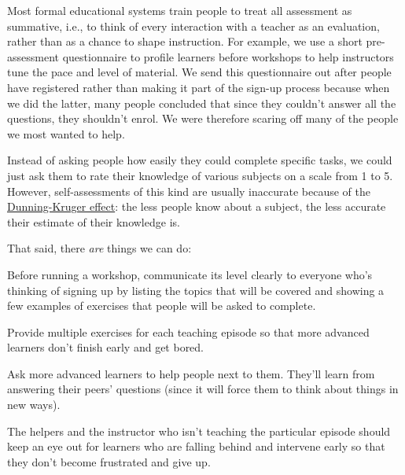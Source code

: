 
Most formal educational systems train people to treat all assessment
as summative, i.e., to think of every interaction with a teacher as an
evaluation, rather than as a chance to shape instruction.  For
example, we use a short pre-assessment questionnaire to profile
learners before workshops to help instructors tune the pace and level
of material. We send this questionnaire out after people have
registered rather than making it part of the sign-up process because
when we did the latter, many people concluded that since they couldn't
answer all the questions, they shouldn't enrol. We were therefore
scaring off many of the people we most wanted to help.

Instead of asking people how easily they could complete specific tasks,
we could just ask them to rate their knowledge of various subjects on a
scale from 1 to 5. However, self-assessments of this kind are usually
inaccurate because of the
\href{https://en.wikipedia.org/wiki/Dunning\%E2\%80\%93Kruger\_effect}{Dunning-Kruger
effect}: the less people know about a subject, the less accurate their
estimate of their knowledge is.

That said, there \emph{are} things we can do:

\begin{gitemize}

\item
  Before running a workshop, communicate its level clearly to everyone
  who's thinking of signing up by listing the topics that will be
  covered and showing a few examples of exercises that people will be
  asked to complete.

\item
  Provide multiple exercises for each teaching episode so that more
  advanced learners don't finish early and get bored.

\item
  Ask more advanced learners to help people next to them. They'll
  learn from answering their peers' questions (since it will force
  them to think about things in new ways).

\item
  The helpers and the instructor who isn't teaching the particular
  episode should keep an eye out for learners who are falling behind
  and intervene early so that they don't become frustrated and give
  up.

\end{gitemize}

